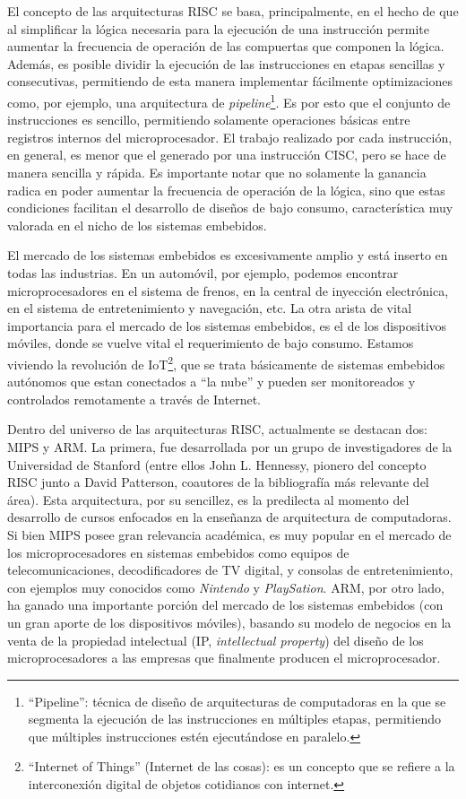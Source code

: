 El concepto de las arquitecturas RISC se basa, principalmente, en el hecho de que al simplificar la lógica necesaria para la ejecución de una instrucción permite aumentar la frecuencia de operación de las compuertas que componen la lógica. Además, es posible dividir la ejecución de las instrucciones en etapas sencillas y consecutivas, permitiendo de esta manera implementar fácilmente optimizaciones como, por ejemplo, una arquitectura de \emph{pipeline}\footnote{``Pipeline'': técnica de diseño de arquitecturas de computadoras en la que se segmenta la ejecución de las instrucciones en múltiples etapas, permitiendo que múltiples instrucciones estén ejecutándose en paralelo.}. Es por esto que el conjunto de instrucciones es sencillo, permitiendo solamente operaciones básicas entre registros internos del microprocesador. El trabajo realizado por cada instrucción, en general, es menor que el generado por una instrucción CISC, pero se hace de manera sencilla y rápida. Es importante notar que no solamente la ganancia radica en poder aumentar la frecuencia de operación de la lógica, sino que estas condiciones facilitan el desarrollo de diseños de bajo consumo, característica muy valorada en el nicho de los sistemas embebidos.

El mercado de los sistemas embebidos es excesivamente amplio y está inserto en todas las industrias. En un automóvil, por ejemplo, podemos encontrar microprocesadores en el sistema de frenos, en la central de inyección electrónica, en el sistema de entretenimiento y navegación, etc. La otra arista de vital importancia para el mercado de los sistemas embebidos, es el de los dispositivos móviles, donde se vuelve vital el requerimiento de bajo consumo. Estamos viviendo la revolución de IoT\footnote{``Internet of Things'' (Internet de las cosas): es un concepto que se refiere a la interconexión digital de objetos cotidianos con internet.}, que se trata básicamente de sistemas embebidos autónomos que estan conectados a ``la nube'' y pueden ser monitoreados y controlados remotamente a través de Internet.

Dentro del universo de las arquitecturas RISC, actualmente se destacan dos: MIPS y ARM. La primera, fue desarrollada por un grupo de investigadores de la Universidad de Stanford (entre ellos John L. Hennessy, pionero del concepto RISC junto a David Patterson, coautores de la bibliografía más relevante del área). Esta arquitectura, por su sencillez, es la predilecta al momento del desarrollo de cursos enfocados en la enseñanza de arquitectura de computadoras. Si bien MIPS posee gran relevancia académica, es muy popular en el mercado de los microprocesadores en sistemas embebidos como equipos de telecomunicaciones, decodificadores de TV digital, y consolas de entretenimiento, con ejemplos muy conocidos como \emph{Nintendo} y \emph{PlaySation}. ARM, por otro lado, ha ganado una importante porción del mercado de los sistemas embebidos (con un gran aporte de los dispositivos móviles), basando su modelo de negocios en la venta de la propiedad intelectual (IP, \emph{intellectual property}) del diseño de los microprocesadores a las empresas que finalmente producen el microprocesador.


